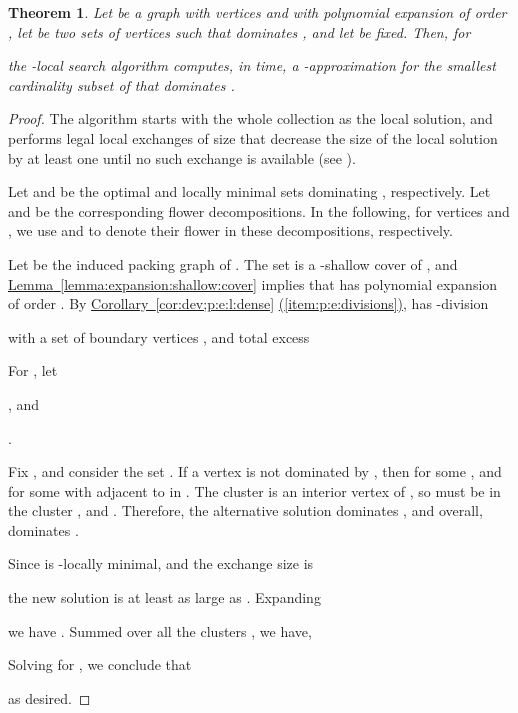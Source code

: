 \documentclass[12pt]{article}
\newtheorem{theorem}{Theorem}\newtheorem{lemma}[theorem]{Lemma}\newtheorem*{restate*}[theorem]{Restatement of }\newtheorem{corollary}[theorem]{Corollary}
\theoremstyle{remark}\theoremheaderfont{\sf}\theorembodyfont{\upshape}
\numberwithin{figure}{section}\numberwithin{table}{section}\numberwithin{equation}{section}
\newcommand{\HLinkSuffix}[3]{\hyperref[#2]{#1\ref*{#2}{#3}}}
\newcommand{\HLinkShort}[2]{\hyperref[#2]{#1\ref*{#2}}}
\newcommand{\HLink}[2]{\hyperref[#2]{#1~\ref*{#2}}}
\newcommand{\HLinkPage}[2]{\hyperref[#2]{#1~\ref*{#2}}}
\newcommand{\corref}[1]{\HLink{Corollary}{cor:#1}}\newcommand{\correfshort}[1]{\HLinkShort{C}{cor:#1}}\newcommand{\correfpage}[1]{\HLinkPage{Corollary}{cor:#1}}
\newcommand{\lemref}[1]{\HLink{Lemma}{lemma:#1}}
\newcommand{\itemref}[1]{\HLinkSuffix{(}{item:#1}{)}}
\newcommand{\thmlab}[1]{{\label{theo:#1}}}
\begin{document}
\begin{theorem} \thmlab{ptas:subset:dom} Let  be a graph with  vertices and with polynomial
  expansion of order , let  be
  two sets of vertices such that  dominates , and
  let  be fixed. Then, for
  
  the -local search algorithm computes, in
   time, a -approximation for the
  smallest cardinality subset of  that dominates .
\end{theorem}
\begin{proof}
  The algorithm starts with the whole collection  as the
  local solution, and performs legal local exchanges
  of size  that decrease the size of the local solution by at
  least one until no such exchange is available (see
  ).

  Let  and  be the
  optimal and locally minimal sets dominating , respectively.
  Let  and
   be the corresponding flower
  decompositions. In the following, for vertices  and
  , we use  and  to
  denote their flower in these decompositions, respectively.

  Let  be the
  induced packing graph of .  The
  set  is a -shallow cover of , and
  \lemref{expansion:shallow:cover} implies that  has
  polynomial expansion of order .  By \corref{dev;p:e:l:dense}
  \itemref{p:e:divisions},  has
  -division
  
  with a set of boundary vertices , and total excess
  
  For , let \smallskip
  \begin{compactenum}[\qquad(i)]
  \item
    

  \item
    , and 

  \item .
  \end{compactenum}

  \smallskip Fix , and consider the set
  .  If a vertex
   is not dominated by ,
  then 
  for some , and
   for
  some  with  adjacent to
   in . The cluster  is an
  interior vertex of , so  must be in the
  cluster , and . Therefore, the
  alternative solution  dominates , and overall,
   dominates .

  Since  is -locally minimal, and the exchange size
  is
  
  the new solution  is at least as large as
  . Expanding
  
  we have . Summed over all
  the clusters , we have,
  
  Solving for , we conclude that
  
  as desired.
\end{proof}
\end{document}
